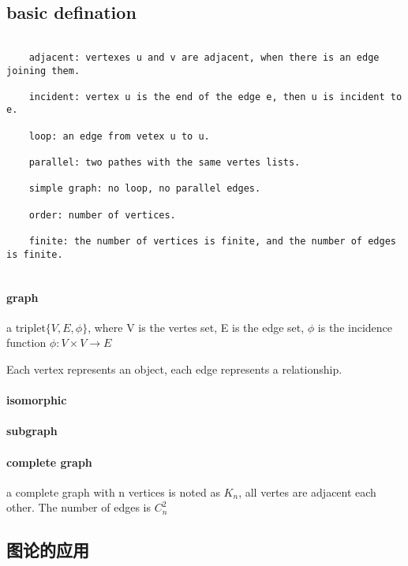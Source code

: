 \documentclass[UTF8]{../09-Mathematics}
\begin{document}
\subsection{basic defination}


\begin{lstlisting}

    adjacent: vertexes u and v are adjacent, when there is an edge joining them.

    incident: vertex u is the end of the edge e, then u is incident to e.

    loop: an edge from vetex u to u. 

    parallel: two pathes with the same vertes lists.

    simple graph: no loop, no parallel edges.

    order: number of vertices.

    finite: the number of vertices is finite, and the number of edges is finite.
   

\end{lstlisting}



\paragraph{graph}

a triplet$\{V,E, \phi\}$, where V is the vertes set, E is the edge set, $\phi$ is the incidence function $\phi: V \times V \to E$

Each vertex represents an object, each edge represents a relationship.


\paragraph{isomorphic}

\paragraph{subgraph}

\paragraph{complete graph}

a complete graph with n vertices is noted as $K_n$, all vertes are adjacent each other. The number of edges is $C_n^2$





\subsection{图论的应用}


 
\end{document}
